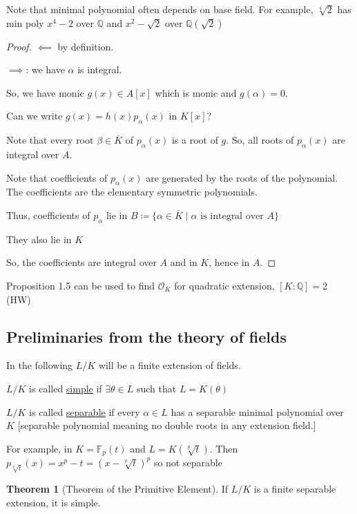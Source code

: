 \documentclass[openany]{amsbook}
\numberwithin{section}{chapter}
\theoremstyle{definition}
\newtheorem{theorem}{Theorem}[chapter]
\begin{document}
Note that minimal polynomial often depends on base field. For example, \(\sqrt[4]{2}\) has min poly \(x^4 - 2\) over \(\mathbb{Q}\) and \(x^2 - \sqrt{2}\) over \(\mathbb{Q} (\sqrt{2})\) 

\begin{proof}
    \(\impliedby\) by definition.

    \(\implies \): we have \(\alpha \) is integral.

    So, we have monic \(g(x)\in A[x]\) which is monic and \(g(\alpha) = 0\).

    Can we write \(g(x) = h(x) p_\alpha(x)\) in \(K[x]\)?

    Note that every root \(\beta\in \overline{K}\) of \(p_\alpha(x)\) is a root of \(g\). So, all roots of \(p_\alpha(x)\) are integral over \(A\).
    
    Note that coefficients of \(p_\alpha(x)\) are generated by the roots of the polynomial. The coefficients are the elementary symmetric polynomials.

    Thus, coefficients of \(p_\alpha\) lie in \(B \coloneqq \{ \alpha \in \overline{K} \mid \alpha \text{ is integral over } A \} \) 
    
    They also lie in \(K\)

    So, the coefficients are integral over \(A\) and in \(K\), hence in \(A\).

\end{proof}

Proposition 1.5 can be used to find \(\mathcal{O}_K\) for quadratic extension, \([K : \mathbb{Q} ] = 2\) (HW)

\subsection*{Preliminaries from the theory of fields}


In the following \(L / K\) will be a finite extension of fields.

\(L / K\) is called \underline{simple} if \(\exists \theta \in L\) such that \(L = K(\theta)\) 

\(L / K\) is called \underline{separable} if every \(\alpha \in L\) has a separable minimal polynomial over \(K\) [separable polynomial meaning no double roots in any extension field.]

For example, in \(K = \mathbb{F}_p(t)\) and \(L   = K(\sqrt[p]{t})\). Then \(p_{\sqrt[p]{t}}(x) = x^p - t = (x - \sqrt[p]{t})^p\) so not separable

\begin{theorem}
    [Theorem of the Primitive Element]
    
    If \(L / K\) is a finite separable extension, it is simple. 
\end{theorem}
\end{document}
